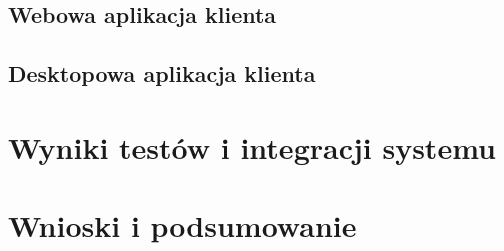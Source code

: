 \documentclass[11pt, a4paper]{article}
\begin{document}
\subsection{Webowa aplikacja klienta}

\subsection{Desktopowa aplikacja klienta}
\newpage
\section{Wyniki testów i integracji systemu}

\newpage

\section{Wnioski i podsumowanie}


\newpage

\printbibliography[heading=bibintoc]
\end{document}
